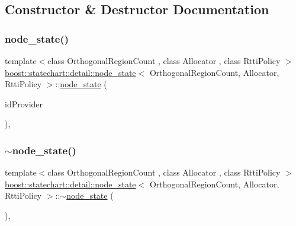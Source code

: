 \subsection{Constructor \& Destructor Documentation}
\mbox{\label{classboost_1_1statechart_1_1detail_1_1node__state_ac0adf39c0e3b92be15801f8d25bf4996}} 
\subsubsection{\texorpdfstring{node\+\_\+state()}{node\_state()}}
{\footnotesize\ttfamily template$<$class Orthogonal\+Region\+Count , class Allocator , class Rtti\+Policy $>$ \\
\mbox{\hyperlink{classboost_1_1statechart_1_1detail_1_1node__state}{boost\+::statechart\+::detail\+::node\+\_\+state}}$<$ Orthogonal\+Region\+Count, Allocator, Rtti\+Policy $>$\+::\mbox{\hyperlink{classboost_1_1statechart_1_1detail_1_1node__state}{node\+\_\+state}} (\begin{DoxyParamCaption}\item[{typename Rtti\+Policy\+::id\+\_\+provider\+\_\+type}]{id\+Provider }\end{DoxyParamCaption})\hspace{0.3cm}{\ttfamily [inline]}, {\ttfamily [protected]}}

\mbox{\label{classboost_1_1statechart_1_1detail_1_1node__state_a50990fc8652671fc112570393c2d3204}} 
\subsubsection{\texorpdfstring{$\sim$node\+\_\+state()}{~node\_state()}}
{\footnotesize\ttfamily template$<$class Orthogonal\+Region\+Count , class Allocator , class Rtti\+Policy $>$ \\
\mbox{\hyperlink{classboost_1_1statechart_1_1detail_1_1node__state}{boost\+::statechart\+::detail\+::node\+\_\+state}}$<$ Orthogonal\+Region\+Count, Allocator, Rtti\+Policy $>$\+::$\sim$\mbox{\hyperlink{classboost_1_1statechart_1_1detail_1_1node__state}{node\+\_\+state}} (\begin{DoxyParamCaption}{ }\end{DoxyParamCaption})\hspace{0.3cm}{\ttfamily [inline]}, {\ttfamily [protected]}}



